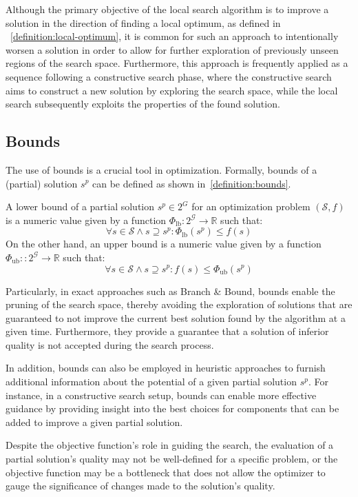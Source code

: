 Although the primary objective of the local search algorithm is to improve a
solution in the direction of finding a local optimum, as defined in
~\ref{definition:local-optimum}, it is common for such an approach to
intentionally worsen a solution in order to allow for further exploration of
previously unseen regions of the search space. Furthermore, this approach is
frequently applied as a sequence following a constructive search phase, where
the constructive search aims to construct a new solution by exploring the search
space, while the local search subsequently exploits the properties of the found
solution.


\subsection{Bounds}
\label{section:bounds}

The use of bounds is a crucial tool in optimization. Formally, bounds of a
(partial) solution $s^{p}$ can be defined as shown in~\ref{definition:bounds}.

\begin{definition}
  \label{definition:bounds}
  A lower bound of a partial solution $s^p \in 2^G$ for an optimization problem
  $(\mathcal{S}, f)$ is a numeric value given by a function $\Phi_\text{lb}
    : 2^{\mathcal{G}} \rightarrow \mathbb{R}$ such that:
  \begin{equation}
    \forall s \in \mathcal{S} \land s \supseteq s^p : \Phi_\text{lb}(s^p) \le f(s)
  \end{equation}
  On the other hand, an upper bound is a numeric value given by a function $\Phi_\text{ub} :
    : 2^{\mathcal{G}} \rightarrow \mathbb{R} $ such that:
  \begin{equation}
    \forall s \in \mathcal{S} \land s \supseteq s^p : f(s) \le \Phi_\text{ub}(s^p)
  \end{equation}
\end{definition}


Particularly, in exact approaches such as Branch \& Bound, bounds
enable the pruning of the search space, thereby avoiding the exploration of
solutions that are guaranteed to not improve the current best solution found by
the algorithm at a given time. Furthermore, they provide a guarantee that a
solution of inferior quality is not accepted during the search process.

In addition, bounds can also be employed in heuristic approaches to furnish
additional information about the potential of a given partial solution $s^{p}$.
For instance, in a constructive search setup, bounds can enable more effective
guidance by providing insight into the best choices for components that can be
added to improve a given partial solution.

Despite the objective function's role in guiding the search, the evaluation of a
partial solution's quality may not be well-defined for a specific problem, or
the objective function may be a bottleneck that does not allow the optimizer to
gauge the significance of changes made to the solution's quality.